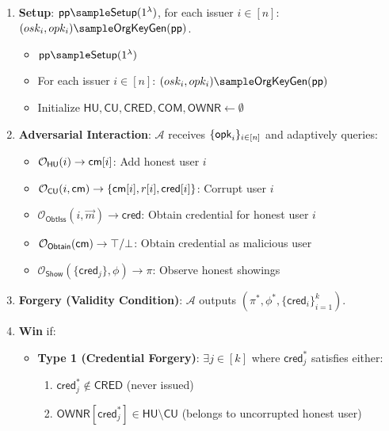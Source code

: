 \begin{enumerate}
    \item \textbf{Setup}: $\ppar \sample \mathsf{Setup}(1^\lambda)$, for each issuer $i \in [n]$: $(osk_i, opk_i) \sample \mathsf{OrgKeyGen}(\ppar)$.  
        \begin{itemize}
            \item $\ppar \sample \mathsf{Setup}(1^\lambda)$
            \item For each issuer $i \in [n]$: $(osk_i, opk_i) \sample \mathsf{OrgKeyGen}(\ppar)$
            \item Initialize $\mathsf{HU}, \mathsf{CU}, \mathsf{CRED}, \mathsf{COM}, \mathsf{OWNR} \gets \emptyset$
        \end{itemize}
    \item \textbf{Adversarial Interaction}: $\mathcal{A}$ receives $\{\mathsf{opk}_i\}_{i \in [n]}$ and adaptively queries:
        \begin{itemize}
            \item $\mathcal{O}_{\mathsf{HU}}(i) \rightarrow \mathsf{cm}[i]$: Add honest user $i$
            \item $\mathcal{O}_{\mathsf{CU}}(i, \mathsf{cm}) \rightarrow \{\mathsf{cm}[i], r[i], \mathsf{cred}[i]\}$: Corrupt user $i$
            \item $\mathcal{O}_{\mathsf{ObtIss}}(i, \vec{m}) \rightarrow \mathsf{cred}$: Obtain credential for honest user $i$
            \item $\mathcal{O}_{\mathsf{Obtain}}(\mathsf{cm}) \rightarrow \top/\bot$: Obtain credential as malicious user
            \item $\mathcal{O}_{\mathsf{Show}}(\{\mathsf{cred}_j\}, \phi) \rightarrow \pi$: Observe honest showings
        \end{itemize}
    \item \textbf{Forgery (Validity Condition)}: $\mathcal{A}$ outputs $(\pi^*, \phi^*, \{\mathsf{cred}_i\}_{i=1}^k)$.  

    \item \textbf{Win} if:
    \begin{itemize}
        \item \textbf{Type 1 (Credential Forgery)}: 
        $\exists j \in [k]$ where $\mathsf{cred}_j^*$ satisfies either:
        \begin{enumerate}
            \item $\mathsf{cred}_j^* \notin \mathsf{CRED}$ (never issued)
            \item $\mathsf{OWNR}[\mathsf{cred}_j^*] \in \mathsf{HU} \setminus \mathsf{CU}$ (belongs to uncorrupted honest user)
        \end{enumerate}


\end{itemize}
\end{enumerate}
